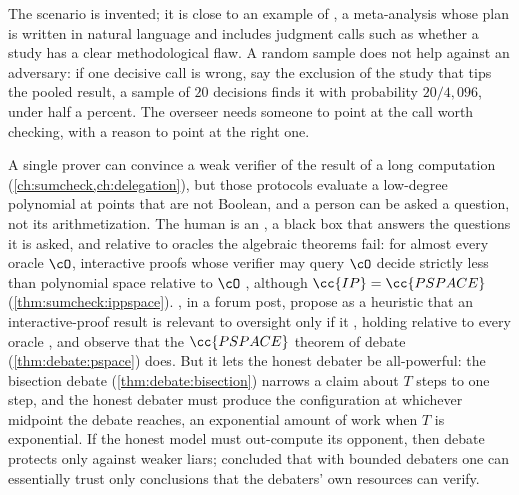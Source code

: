 \begin{refsection}
The scenario is invented; it is close to an example of \textcite{BrownCohenEtAl2024}, a meta-analysis whose plan is written in natural language and includes judgment calls such as whether a study has a clear methodological flaw. A random sample does not help against an adversary: if one decisive call is wrong, say the exclusion of the study that tips the pooled result, a sample of $20$ decisions finds it with probability $20/4{,}096$, under half a percent. The overseer needs someone to point at the call worth checking, with a reason to point at the right one.

A single prover can convince a weak verifier of the result of a long computation (\cref{ch:sumcheck,ch:delegation}), but those protocols evaluate a low-degree polynomial at points that are not Boolean, and a person can be asked a question, not its arithmetization. The human is an , a black box that answers the questions it is asked, and relative to oracles the algebraic theorems fail: for almost every oracle $\cO$, interactive proofs whose verifier may query $\cO$ decide strictly less than polynomial space relative to $\cO$ \parencite{ChangEtAl1994}, although $\cc{IP}=\cc{PSPACE}$ (\cref{thm:sumcheck:ippspace}). \Textcite{IrvingMarshall2025}, in a forum post, propose as a heuristic that an interactive-proof result is relevant to oversight only if it , holding relative to every oracle \parencite{Fortnow1994}, and observe that the $\cc{PSPACE}$ theorem of debate (\cref{thm:debate:pspace}) does. But it lets the honest debater be all-powerful: the bisection debate (\cref{thm:debate:bisection}) narrows a claim about $T$ steps to one step, and the honest debater must produce the configuration at whichever midpoint the debate reaches, an exponential amount of work when $T$ is exponential. If the honest model must out-compute its opponent, then debate protects only against weaker liars; \textcite{Barnes2020} concluded that with bounded debaters one can essentially trust only conclusions that the debaters' own resources can verify.


\end{refsection}
